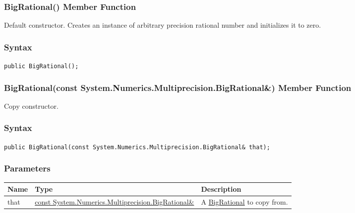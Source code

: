 \documentclass[a4paper,oneside,11.000000pt]{book}
\begin{document}
\hypertarget{System.Numerics.Multiprecision.BigRational.constructor.P.System.Numerics.Multiprecision.BigRational}{\subsubsection*{BigRational() Member Function}}
\begin{flushleft}
Default constructor. Creates an instance of arbitrary precision rational number and initializes it to zero.

\end{flushleft}
\subsubsection*{Syntax}\texttt{public BigRational();}
\clearpage

\hypertarget{System.Numerics.Multiprecision.BigRational.constructor.P.System.Numerics.Multiprecision.BigRational.C.R.System.Numerics.Multiprecision.BigRational}{\subsubsection*{BigRational(const System.Numerics.Multiprecision.BigRational\&) Member Function}}\begin{flushleft}
Copy constructor. 

\end{flushleft}
\subsubsection*{Syntax}
\texttt{public BigRational(const System.Numerics.Multiprecision.BigRational\& that);}
\subsubsection*{Parameters}
\begin{flushleft}
\begin{supertabular}[l]{!{\raggedright}p{1.30721cm}!{\raggedright}p{8.55945cm}!{\raggedright}p{4.93333cm}}
\textbf{Name}
& \textbf{Type}
& \textbf{Description}
\\
\hline
that
& \hyperlink{System.Numerics.Multiprecision.BigRational}{const System.\-Numerics.\-Multiprecision.\-BigRational\&\-}
& A \hyperlink{System.Numerics.Multiprecision.BigRational}{BigRational} to copy from.

\\
\end{supertabular}

\end{flushleft}
\clearpage
\end{document}
